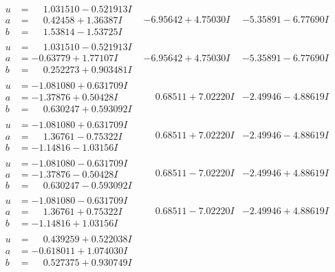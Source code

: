 \documentclass[1p]{elsarticle_modified}
\theoremstyle{definition}
\begin{document}
$$\begin{array}{c|c|c}
\begin{aligned}
u &= \phantom{-}1.031510 - 0.521913 I \\
a &= \phantom{-}0.42458 + 1.36387 I \\
b &= \phantom{-}1.53814 - 1.53725 I\end{aligned}
 & -6.95642 + 4.75030 I & -5.35891 - 6.77690 I \\ \hline\begin{aligned}
u &= \phantom{-}1.031510 - 0.521913 I \\
a &= -0.63779 + 1.77107 I \\
b &= \phantom{-}0.252273 + 0.903481 I\end{aligned}
 & -6.95642 + 4.75030 I & -5.35891 - 6.77690 I \\ \hline\begin{aligned}
u &= -1.081080 + 0.631709 I \\
a &= -1.37876 + 0.50428 I \\
b &= \phantom{-}0.630247 + 0.593092 I\end{aligned}
 & \phantom{-}0.68511 + 7.02220 I & -2.49946 - 4.88619 I \\ \hline\begin{aligned}
u &= -1.081080 + 0.631709 I \\
a &= \phantom{-}1.36761 - 0.75322 I \\
b &= -1.14816 - 1.03156 I\end{aligned}
 & \phantom{-}0.68511 + 7.02220 I & -2.49946 - 4.88619 I \\ \hline\begin{aligned}
u &= -1.081080 - 0.631709 I \\
a &= -1.37876 - 0.50428 I \\
b &= \phantom{-}0.630247 - 0.593092 I\end{aligned}
 & \phantom{-}0.68511 - 7.02220 I & -2.49946 + 4.88619 I \\ \hline\begin{aligned}
u &= -1.081080 - 0.631709 I \\
a &= \phantom{-}1.36761 + 0.75322 I \\
b &= -1.14816 + 1.03156 I\end{aligned}
 & \phantom{-}0.68511 - 7.02220 I & -2.49946 + 4.88619 I \\ \hline\begin{aligned}
u &= \phantom{-}0.439259 + 0.522038 I \\
a &= -0.618011 + 1.074030 I \\
b &= \phantom{-}0.527375 + 0.930749 I\end{aligned}

\end{array}$$
\end{document}
